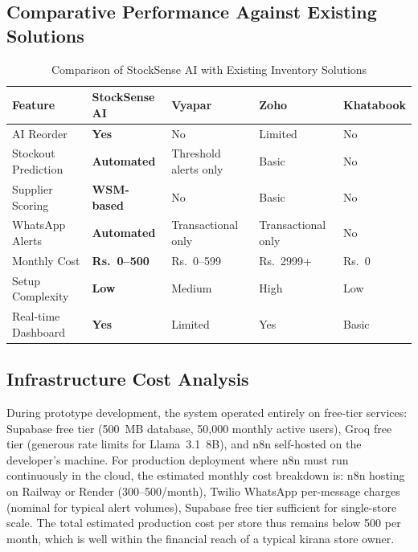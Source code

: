 \subsection{Comparative Performance Against Existing Solutions}

\begin{table}[H]
\centering
\caption{Comparison of StockSense AI with Existing Inventory Solutions}
\label{tab:comparison}
{\singlespacing
\renewcommand{\arraystretch}{1.3}
\begin{tabularx}{\textwidth}{@{} >{\raggedright\arraybackslash}p{4.8cm} >{\raggedright\arraybackslash}X >{\raggedright\arraybackslash}X >{\raggedright\arraybackslash}X >{\raggedright\arraybackslash}X @{}}
\toprule
\textbf{Feature} & \textbf{StockSense AI} & \textbf{Vyapar} & \textbf{Zoho} & \textbf{Khatabook} \\
\midrule
AI Reorder & \textbf{Yes} & No & Limited & No \\
Stockout Prediction & \textbf{Automated} & Threshold alerts only & Basic & No \\
Supplier Scoring & \textbf{WSM-based} & No & Basic & No \\
WhatsApp Alerts & \textbf{Automated} & Transactional only & Transactional only & No \\
Monthly Cost & \textbf{Rs.\ 0--500} & Rs.\ 0--599 & Rs.\ 2999+ & Rs.\ 0 \\
Setup Complexity & \textbf{Low} & Medium & High & Low \\
Real-time Dashboard & \textbf{Yes} & Limited & Yes & Basic \\
\bottomrule
\end{tabularx}
}
\end{table}

\subsection{Infrastructure Cost Analysis}

During prototype development, the system operated entirely on free-tier services: Supabase
free tier (500~MB database, 50,000 monthly active users), Groq free tier (generous rate
limits for Llama~3.1~8B), and n8n self-hosted on the developer's machine. For production
deployment where n8n must run continuously in the cloud, the estimated monthly cost breakdown
is: n8n hosting on Railway or Render (\rupee{}300--500/month), Twilio WhatsApp per-message
charges (nominal for typical alert volumes), Supabase free tier sufficient for single-store
scale. The total estimated production cost per store thus remains below \rupee{}500 per month,
which is well within the financial reach of a typical kirana store owner.
